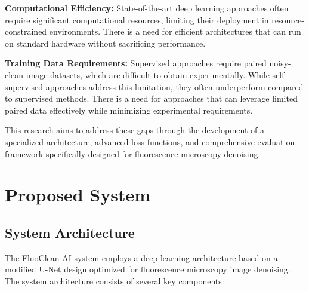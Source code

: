 \documentclass[12pt,a4paper]{report}
\begin{document}
\vspace{0.5cm}

\textbf{Computational Efficiency:} State-of-the-art deep learning approaches often require significant computational resources, limiting their deployment in resource-constrained environments. There is a need for efficient architectures that can run on standard hardware without sacrificing performance.

\vspace{0.5cm}

\textbf{Training Data Requirements:} Supervised approaches require paired noisy-clean image datasets, which are difficult to obtain experimentally. While self-supervised approaches address this limitation, they often underperform compared to supervised methods. There is a need for approaches that can leverage limited paired data effectively while minimizing experimental requirements.

\vspace{0.5cm}

This research aims to address these gaps through the development of a specialized architecture, advanced loss functions, and comprehensive evaluation framework specifically designed for fluorescence microscopy denoising.

\chapter{Proposed System}
\label{chap:proposed}

\section{System Architecture}

The FluoClean AI system employs a deep learning architecture based on a modified U-Net design optimized for fluorescence microscopy image denoising. The system architecture consists of several key components:

\vspace{0.5cm}
\end{document}
